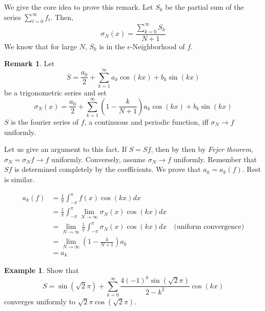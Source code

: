\documentclass[12pt]{amsart}
\theoremstyle{definition}
\newtheorem{example}[theorem]{Example}
\newtheorem{remark}[theorem]{Remark}
\begin{document}
 We give the core idea to prove this remark. Let $S_k$ be the partial sum of the series  $\sum_{t = 0}^{\infty}f_t$. Then,
\[
\sigma_N(x) = \frac{\sum_{k = 0}^{\infty}S_k}{N+1}
\]
We know that for large $N$, $S_k$ is in the $\epsilon$-Neighborhood of \(f\).



\begin{remark}
    Let
    \[
    S = \frac{a_0}{2} +\sum_{k=1}^{\infty}a_k\cos(kx) + b_k\sin(kx)
    \]
    be a trigonometric series and set
    \[
    \sigma_N(x) = \frac{a_0}{2} +\sum_{k=1}^{\infty}(1 - \frac{k}{N+1})a_k\cos(kx) + b_k\sin(kx)
    \]
    $S$ is the fourier series of $f$, a continuous and periodic function, iff $\sigma_N \to f$ uniformly.
\end{remark}


Let us give an argument to this fact.
    If $ S = Sf$, then by then by \textit{Fejer theorem}, $\sigma_N = \sigma_Nf \to f$ uniformly.
    Conversely, assume $\sigma_N \to f$ uniformly. Remember that $Sf$ is determined completely by the coefficients. We prove that $a_k = a_k(f)$. Rest is similar.

    \begin{align*}
        a_k(f) &= \frac{1}{\pi} \int_{-\pi}^{\pi} f(x) \cos(kx) dx\\
        &= \frac{1}{\pi} \int_{-\pi}^{\pi} \lim_{N \to \infty}\sigma_N(x) \cos(kx) dx\\
        &= \lim_{N \to \infty} \frac{1}{\pi} \int_{-\pi}^{\pi} \sigma_N(x) \cos(kx) dx \quad \text{(uniform convergence)}\\
        &= \lim_{N \to \infty} (1 - \frac{k}{N+1})a_k \\
        &= a_k
    \end{align*}



\begin{example}
    Show that
    \[
    S = \sin(\sqrt{2}\pi) + \sum_{k=0}^{\infty}\frac{4(-1)^k\sin(\sqrt{2}\pi)}{2-k^2}\cos(kx)
    \]
    converges uniformly to $\sqrt{2}\pi\cos(\sqrt{2}\pi)$.
\end{example}
\end{document}
